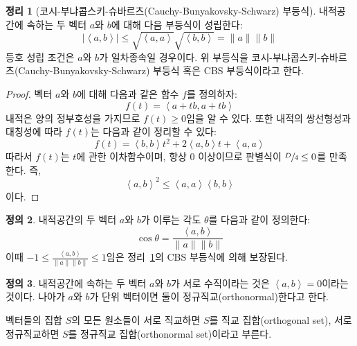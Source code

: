 \documentclass[unfonts,oneside,a4paper]{oblivoir}
\theoremstyle{definition}
\newtheorem{definition}{정의}[section]
\theoremstyle{theorem}
\newtheorem{theorem}[definition]{정리}
\theoremstyle{theorem}
\theoremstyle{remark}
\theoremstyle{remark}
\theoremstyle{remark}
\theoremstyle{remark}
\renewcommand{\vec}[1]{\bm{\mathit{#1}}}
\begin{document}
\begin{theorem} [코시-부냐콥스키-슈바르츠(Cauchy-Bunyakovsky-Schwarz) 부등식] \label{thm:CBS}
    내적공간에 속하는 두 벡터 $\vec a$와 $\vec b$에 대해 다음 부등식이 성립한다:
    \begin{equation*}
        \bigl|\left<\vec a, \vec b\right>\bigr| \leq \sqrt{\left<\vec a, \vec a\right>} \sqrt{\left<\vec b, \vec b\right>} = \lVert \vec a \rVert \lVert \vec b \rVert
    \end{equation*}
    등호 성립 조건은 $\vec a$와 $\vec b$가 일차종속일 경우이다.
    위 부등식을 코시-부냐콥스키-슈바르츠(Cauchy-Bunyakovsky-Schwarz) 부등식 혹은 CBS 부등식이라고 한다.
\end{theorem}

\begin{proof}
    벡터 $\vec a$와 $\vec b$에 대해 다음과 같은 함수 $f$를 정의하자:
    \begin{equation*}
        f(t) = \left<\vec a + t \vec b, \vec a + t \vec b\right>
    \end{equation*}
    내적은 양의 정부호성을 가지므로 $f(t) \geq 0$임을 알 수 있다.
    또한 내적의 쌍선형성과 대칭성에 따라 $f(t)$는 다음과 같이 정리할 수 있다:
    \begin{equation*}
        f(t) = \left<\vec b, \vec b\right> t^2 + 2 \left<\vec a, \vec b\right> t + \left<\vec a, \vec a\right>
    \end{equation*}
    따라서 $f(t)$는 $t$에 관한 이차함수이며, 항상 0 이상이므로 판별식이 $\sfrac D4 \leq 0$를 만족한다.
    즉,
    \begin{equation*}
       \left<\vec a, \vec b\right>^2 \leq \left<\vec a, \vec a\right> \left<\vec b, \vec b\right>
    \end{equation*}
    이다.
\end{proof}

\begin{definition}
    내적공간의 두 벡터 $\vec a$와 $\vec b$가 이루는 각도 $\theta$를 다음과 같이 정의한다:
    \begin{equation*}
        \cos \theta = \frac{\left<\vec a, \vec b\right>}{\lVert \vec a\rVert \lVert \vec b \rVert}
    \end{equation*}
    이때 $-1 \leq \frac{\left<\vec a, \vec b\right>}{\lVert \vec a\rVert \lVert \vec b \rVert} \leq 1$임은 정리~\ref{thm:CBS}의 CBS 부등식에 의해 보장된다.
\end{definition}

\begin{definition}
    내적공간에 속하는 두 벡터 $\vec a$와 $\vec b$가 서로 수직이라는 것은 $\left<\vec a, \vec b\right> = 0$이라는 것이다.
    나아가 $\vec a$와 $\vec b$가 단위 벡터이면 둘이 정규직교(orthonormal)한다고 한다.

    벡터들의 집합 $S$의 모든 원소들이 서로 직교하면 $S$를 직교 집합(orthogonal set), 서로 정규직교하면 $S$를 정규직교 집합(orthonormal set)이라고 부른다.
\end{definition}
\end{document}
